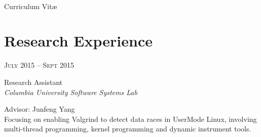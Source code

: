 \documentclass[10pt]{article} %
\begin{document}
\color{text1} %


\par{\\ %
{\color{headings} Curriculum {Vit\ae}\\[15pt]\par} %
	

\begin{minipage}[t]{0.5\textwidth} %
\vspace{0pt} %
	

\section{Research Experience} 






{\raggedleft\textsc{July 2015 -- Sept 2015}\par}

{\raggedright\large Research Assistant\\
\textit{Columbia University Software Systems Lab}\\[5pt]}
Advisor: Junfeng Yang\\
\normalsize{Focusing on enabling Valgrind to detect data races in UserMode Linux, involving multi-thread programming, kernel programming and dynamic instrument tools.}\\



\end{minipage}}
\end{document}
